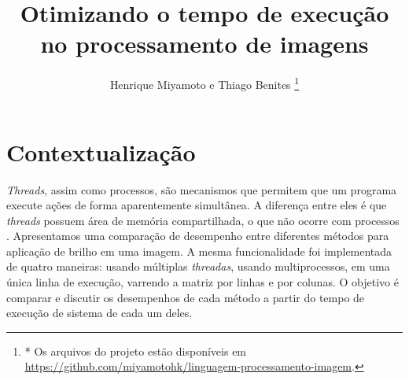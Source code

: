 \documentclass[a4paper, 10pt, conference]{ieeeconf}
\title{\LARGE \bf Otimizando o tempo de execução no processamento de imagens}
\author{Henrique Miyamoto e Thiago Benites \thanks{* Os arquivos do projeto estão disponíveis em \url{https://github.com/miyamotohk/linguagem-processamento-imagem}.}}
\begin{document}
\maketitle
\thispagestyle{empty}
\pagestyle{empty}




\section{Contextualização}


\textit{Threads}, assim como processos, são mecanismos que permitem que um programa execute ações de forma aparentemente simultânea. A diferença entre eles é que \textit{threads} possuem área de memória compartilhada, o que não ocorre com processos \cite{alp}. Apresentamos uma comparação de desempenho entre diferentes métodos para aplicação de brilho em uma imagem. A mesma funcionalidade foi implementada de quatro maneiras: usando múltiplas \textit{threadas}, usando multiprocessos, em uma única linha de execução, varrendo a matriz por linhas e por colunas. O objetivo é comparar e discutir os desempenhos de cada método a partir do tempo de execução de sistema de cada um deles.


\end{document}
